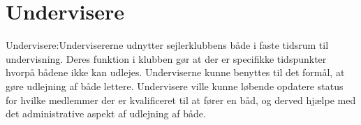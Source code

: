 

\section{Undervisere}
Undervisere:Undervisererne udnytter sejlerklubbens både i faste tidsrum til undervisning. Deres funktion i klubben gør at der er specifikke tidspunkter hvorpå bådene ikke kan udlejes. Underviserne kunne benyttes til det formål, at gøre udlejning af både lettere. Undervisere ville kunne løbende opdatere status for hvilke medlemmer der er kvalificeret til at fører en båd, og derved hjælpe med det administrative aspekt af udlejning af både.